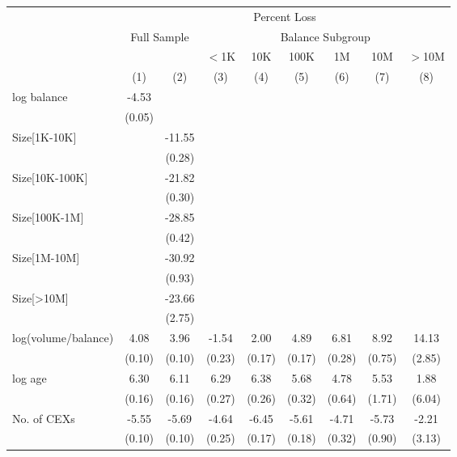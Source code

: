 \begin{center}
    \begin{tabular}{lcccccccc}
        \hline
         & \multicolumn{8}{c}{Percent Loss} \\
        \cline{2-9}
         & \multicolumn{2}{c}{Full Sample} & \multicolumn{6}{c}{Balance Subgroup} \\
        \cline{4-9}
         &  &  & $<$1K & 10K & 100K & 1M & 10M & $>$10M \\
         & (1) & (2) & (3) & (4) & (5) & (6) & (7) & (8) \\
        \hline
        log balance          & -4.53 &  &  &  &  &  &  &  \\
                             & (0.05) &  &  &  &  &  &  &  \\
        Size[1K-10K]         &  & -11.55 &  &  &  &  &  &  \\
                             &  & (0.28) &  &  &  &  &  &  \\
        Size[10K-100K]       &  & -21.82 &  &  &  &  &  &  \\
                             &  & (0.30) &  &  &  &  &  &  \\
        Size[100K-1M]        &  & -28.85 &  &  &  &  &  &  \\
                             &  & (0.42) &  &  &  &  &  &  \\
        Size[1M-10M]         &  & -30.92 &  &  &  &  &  &  \\
                             &  & (0.93) &  &  &  &  &  &  \\
        Size[>10M]           &  & -23.66 &  &  &  &  &  &  \\
                             &  & (2.75) &  &  &  &  &  &  \\
        log(volume/balance)  & 4.08 & 3.96 & -1.54 & 2.00 & 4.89 & 6.81 & 8.92 & 14.13 \\
                             & (0.10) & (0.10) & (0.23) & (0.17) & (0.17) & (0.28) & (0.75) & (2.85) \\
        log age              & 6.30 & 6.11 & 6.29 & 6.38 & 5.68 & 4.78 & 5.53 & 1.88 \\
                             & (0.16) & (0.16) & (0.27) & (0.26) & (0.32) & (0.64) & (1.71) & (6.04) \\
        No. of CEXs          & -5.55 & -5.69 & -4.64 & -6.45 & -5.61 & -4.71 & -5.73 & -2.21 \\
                             & (0.10) & (0.10) & (0.25) & (0.17) & (0.18) & (0.32) & (0.90) & (3.13) \\

\end{tabular}
\end{center}
